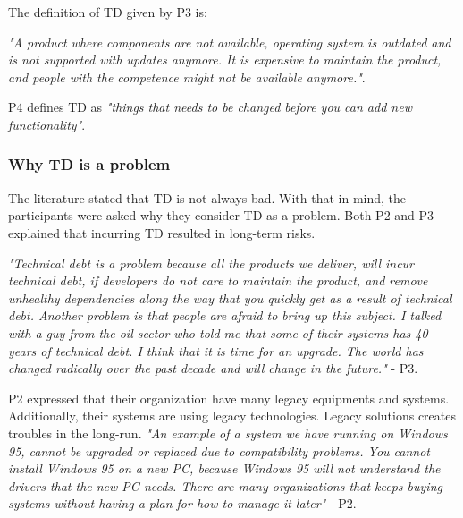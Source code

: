 The definition of TD given by P3 is:
\begin{displayquote}
\textit{"A product where components are not available, operating system is outdated and is not supported with updates anymore. It is expensive to maintain the product, and people with the competence might not be available anymore."}.
\end{displayquote}

P4 defines TD as \textit{"things that needs to be changed before you can add new functionality"}.

\subsubsection{Why TD is a problem}
The literature stated that TD is not always bad\cite{p31-guo}. With that in mind, the participants were asked why they consider TD as a problem. Both P2 and P3 explained that incurring TD resulted in long-term risks. 

\begin{displayquote}
	\textit{"Technical debt is a problem because all the products we deliver, will incur technical debt, if developers do not care to maintain the product, and remove unhealthy dependencies along the way that you quickly get as a result of technical debt. Another problem is that people are afraid to bring up this subject. I talked with a guy from the oil sector who told me that some of their systems has 40 years of technical debt. I think that it is time for an upgrade. The world has changed radically over the past decade and will change in the future."} - P3.
\end{displayquote}

P2 expressed that their organization have many legacy equipments and systems. Additionally, their systems are using legacy technologies. Legacy solutions creates troubles in the long-run. \textit{"An example of a system we have running on Windows 95, cannot be upgraded or replaced due to compatibility problems. You cannot install Windows 95 on a new PC, because Windows 95 will not understand the drivers that the new PC needs. There are many organizations that keeps buying systems without having a plan for how to manage it later"} - P2. 


